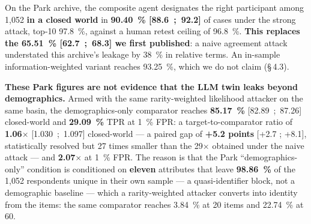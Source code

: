 \documentclass[sigconf,anonymous,review]{acmart}
\begin{document}
On the Park archive, the composite agent designates the right participant among 1,052 \textbf{in a closed world} in \textbf{90.40~\% [88.6~;~92.2]} of cases under the strong attack, top-10 97.8~\%, against a human retest ceiling of 96.8~\%. \textbf{This replaces the 65.51~\% [62.7~;~68.3] we first published}: a naive agreement attack understated this archive's leakage by 38~\% in relative terms. An in-sample information-weighted variant reaches 93.25~\%, which we do not claim (\S\,4.3).

\textbf{These Park figures are not evidence that the LLM twin leaks beyond demographics.} Armed with the same rarity-weighted likelihood attacker on the same basin, the demographics-only comparator reaches \textbf{85.17~\%} [82.89~;~87.26] closed-world and \textbf{29.09~\%} TPR at 1~\% FPR: a target-to-comparator ratio of \textbf{1.06$\times$} [1.030~;~1.097] closed-world --- a paired gap of \textbf{+5.2 points} [+2.7 ; +8.1], statistically resolved but 27 times smaller than the 29$\times$ obtained under the naive attack --- and \textbf{2.07$\times$} at 1~\% FPR. The reason is that the Park ``demographics-only'' condition is conditioned on \textbf{eleven} attributes that leave \textbf{98.86~\%} of the 1,052 respondents unique in their own sample --- a quasi-identifier block, not a demographic baseline --- which a rarity-weighted attacker converts into identity from the items: the same comparator reaches 3.84~\% at 20 items and 22.74~\% at 60.
\end{document}
